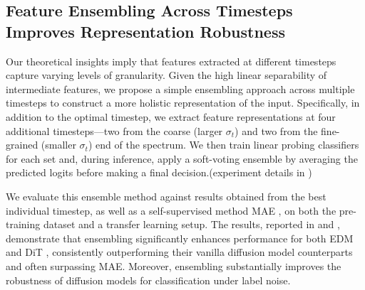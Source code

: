 
\subsection{Feature Ensembling Across Timesteps Improves Representation Robustness}\label{subsec:exp_ensemeble}

Our theoretical insights imply that features extracted at different timesteps capture varying levels of granularity. Given the high linear separability of intermediate features, we propose a simple ensembling approach across multiple timesteps to construct a more holistic representation of the input. Specifically, in addition to the optimal timestep, we extract feature representations at four additional timesteps—two from the coarse (larger $\sigma_t$) and two from the fine-grained (smaller $\sigma_t$) end of the spectrum. We then train linear probing classifiers for each set and, during inference, apply a soft-voting ensemble by averaging the predicted logits before making a final decision.(experiment details in )

We evaluate this ensemble method against results obtained from the best individual timestep, as well as a self-supervised method MAE \citep{he2022masked}, on both the pre-training dataset and a transfer learning setup. The results, reported in  and , demonstrate that ensembling significantly enhances performance for both EDM \citep{karras2022elucidating} and DiT \citep{peebles2023scalable}, consistently outperforming their vanilla diffusion model counterparts and often surpassing MAE. Moreover, ensembling substantially improves the robustness of diffusion models for classification under label noise.

